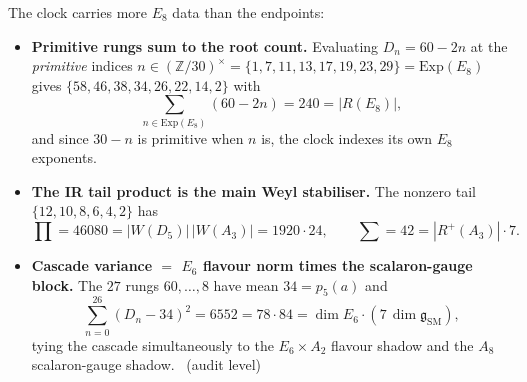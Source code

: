 \documentclass[11pt,a4paper]{article}
\newcommand{\Z}{\mathbb{Z}}
\theoremstyle{definition}
\begin{document}
\begin{winbox}
The clock carries more $E_8$ data than the endpoints:
\begin{itemize}\setlength\itemsep{3pt}
\item\textbf{Primitive rungs sum to the root count.} Evaluating $D_n=60-2n$ at the \emph{primitive}
indices $n\in(\Z/30)^\times=\{1,7,11,13,17,19,23,29\}=\mathrm{Exp}(E_8)$ gives
$\{58,46,38,34,26,22,14,2\}$ with
\[
  \sum_{n\in\mathrm{Exp}(E_8)}(60-2n)=240=|R(E_8)| ,
\]
and since $30-n$ is primitive when $n$ is, the clock indexes its own $E_8$ exponents.
\item\textbf{The IR tail product is the main Weyl stabiliser.} The nonzero tail
$\{12,10,8,6,4,2\}$ has
\[
  \prod=46080=|W(D_5)|\,|W(A_3)|=1920\cdot24,\qquad \textstyle\sum=42=|R^+(A_3)|\cdot7 .
\]
\item\textbf{Cascade variance $=$ $E_6$ flavour norm times the scalaron-gauge block.} The $27$ rungs
$60,\dots,8$ have mean $34=p_5(a)$ and
\[
  \sum_{n=0}^{26}(D_n-34)^2=6552=78\cdot84=\dim E_6\cdot(7\,\dim\mathfrak g_{\mathrm{SM}}) ,
\]
tying the cascade simultaneously to the $E_6{\times}A_2$ flavour shadow and the $A_8$ scalaron-gauge
shadow. \mE\ (audit level)
\end{itemize}
\end{winbox}

\end{document}
